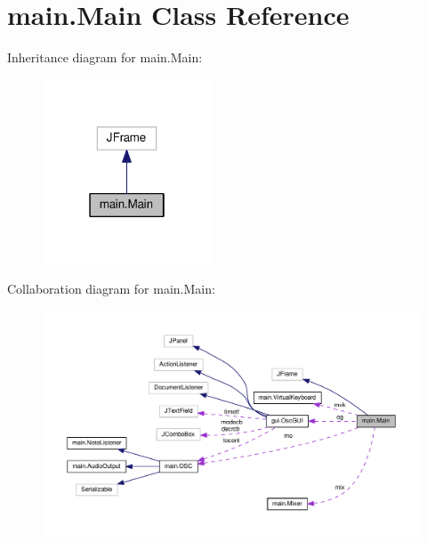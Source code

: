 \hypertarget{classmain_1_1_main}{}\section{main.\+Main Class Reference}
\label{classmain_1_1_main}


Inheritance diagram for main.\+Main\+:
\nopagebreak
\begin{figure}[H]
\begin{center}
\leavevmode
\includegraphics[width=142pt]{classmain_1_1_main__inherit__graph}
\end{center}
\end{figure}


Collaboration diagram for main.\+Main\+:
\nopagebreak
\begin{figure}[H]
\begin{center}
\leavevmode
\includegraphics[width=350pt]{classmain_1_1_main__coll__graph}
\end{center}
\end{figure}
